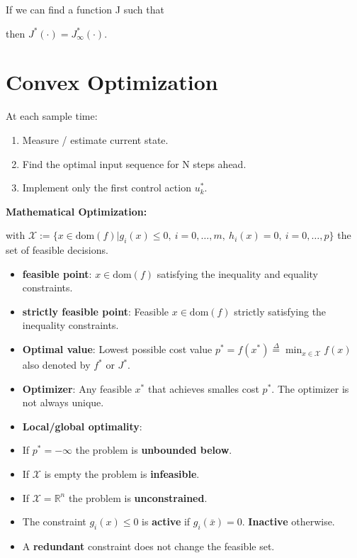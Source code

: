 \documentclass[8pt,a4paper]{scrartcl}
\begin{document}
\begin{multicols*}{3}
If we can find a function J such that


then $J^\ast(\cdot)=J^\ast_\infty(\cdot)$.



\section{Convex Optimization}


At each sample time:

\begin{enumerate}
\ncompaq
\item Measure / estimate current state.
\item Find the optimal input sequence for N steps ahead.
\item Implement only the first control action $u_k^\ast$.
\end{enumerate}

\textbf{Mathematical Optimization:}


with $\mathcal{X}:=\{x\in\text{dom}(f)|g_i(x)\leq 0,\ i=0,\ldots,m,\ h_i(x)=0,\ i=0,\ldots,p\}$ the set of feasible decisions.

\begin{itemize}
\ncompaq
\item \textbf{feasible point}: $x\in\text{dom}(f)$ satisfying the inequality and equality constraints.
\item \textbf{strictly feasible point}: Feasible $x\in\text{dom}(f)$ strictly satisfying the inequality constraints.
\item \textbf{Optimal value}: Lowest possible cost value $p^\ast=f(x^\ast)\overset{\Delta}{=}\min_{x\in\mathcal{X}}f(x)$ also denoted by $f^\ast$ or $J^\ast$.
\item \textbf{Optimizer}: Any feasible $x^\ast$ that achieves smalles cost $p^\ast$. The optimizer is not always unique.
\item \textbf{Local/global optimality}: 

\item If $p^\ast=-\infty$ the problem is \textbf{unbounded below}.
\item If $\mathcal{X}$ is empty the problem is \textbf{infeasible}.
\item If $\mathcal{X}=\mathbb{R}^n$ the problem is \textbf{unconstrained}.
\item The constraint $g_i(x)\leq 0$ is \textbf{active} if $g_i(\bar{x})=0$. \textbf{Inactive} otherwise.
\item A \textbf{redundant} constraint does not change the feasible set.
\end{itemize}


\end{multicols*}
\end{document}
